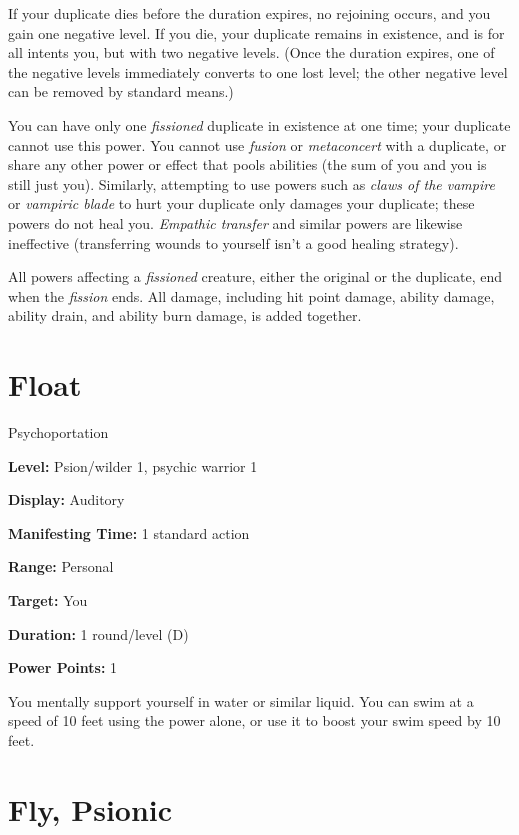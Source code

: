 \documentclass{article}
\begin{document}
If your duplicate dies before the duration expires, no rejoining occurs, and you 
gain one negative level. If you die, your duplicate remains in existence, and is 
for all intents you, but with two negative levels. (Once the duration expires, 
one of the negative levels immediately converts to one lost level; the other negative 
level can be removed by standard means.)

You can have only one \textit{fissioned }duplicate in existence at one time; your 
duplicate cannot use this power. You cannot use \textit{fusion }or \textit{metaconcert 
}with a duplicate, or share any other power or effect that pools abilities (the 
sum of you and you is still just you). Similarly, attempting to use powers such 
as \textit{claws of the vampire }or \textit{vampiric blade }to hurt your duplicate 
only damages your duplicate; these powers do not heal you. \textit{Empathic transfer 
}and similar powers are likewise ineffective (transferring wounds to yourself isn't 
a good healing strategy).

All powers affecting a \textit{fissioned }creature, either the original or the 
duplicate, end when the \textit{fission }ends. All damage, including hit point 
damage, ability damage, ability drain, and ability burn damage, is added together.

\vspace{12pt}
\section*{Float}

Psychoportation

\textbf{Level:} Psion/wilder 1, psychic warrior 1

\textbf{Display:} Auditory

\textbf{Manifesting Time:} 1 standard action

\textbf{Range:} Personal

\textbf{Target:} You

\textbf{Duration:} 1 round/level (D)

\textbf{Power Points:} 1

You mentally support yourself in water or similar liquid. You can swim at a speed 
of 10 feet using the power alone, or use it to boost your swim speed by 10 feet.

\vspace{12pt}
\section*{Fly, Psionic}
\end{document}
